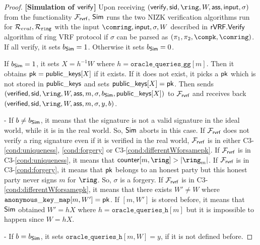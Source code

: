 \begin{proof}
		
		 \noindent\textbf{[Simulation of $ \mathsf{verify} $]} Upon receiving  $(\oramsg{verify}, \sid, \ring,W, \aux,\msg, \sigma)$ from the functionality $\mathcal{F}_{\textsf{rvrf}}$, $ \mathsf{Sim} $ runs the two NIZK verification algorithms run for $ \mathcal{R}_{eval}, \mathcal{R}_{\mathtt{ring}} $ with the input $ \comring, \msg, \sigma, W $ described in $ {\mathsf{rVRF}}.{\mathsf{Verify}} $ algorithm of ring VRF protocol if $ \sigma $ can be parsed as $ (\pi_1,\pi_2, \compk, \comring) $. If  all verify, it sets $ b_{\mathsf{Sim}} =1 $. Otherwise it sets $ b_{\mathsf{Sim}} =0  $.
		
		\noindent If $ b_{\mathsf{Sim}} = 1 $, it sets $ X = h^{-1} W$ where $ h = \mathtt{oracle\_queries\_gg}[m] $. Then it obtains $ \mathsf{pk}  = {\mathsf{public\_keys}}[X]$ if it exists. If it does not exist, it picks a $ \mathsf{pk}  $ which is not stored in $ {\mathsf{public\_keys}} $ and sets $ {\mathsf{public\_keys}}[X] = \mathsf{pk} $. Then sends  $ (\oramsg{verified}, \sid, \ring, W,\aux, m, \sigma, b_\simulator, \pkeys[X]) $ to $ \mathcal{F}_{\textsf{rvrf}} $ and receives back $ (\oramsg{verified}, \sid, \ring, W, \aux, m, \sigma, y, b) $. 
			
			- If $ b \neq b_{\mathsf{Sim}} $, it means that the signature is not a valid signature in the ideal world, while it is in the real world. So, $ \mathsf{Sim} $ aborts in this case.
				If $ \mathcal{F}_{\textsf{rvrf}} $ does not verify a ring signature even if  it is verified in the real world, $ \mathcal{F}_{\textsf{rvrf}} $ is in either C3-\ref{cond:uniqueness}, \ref{cond:forgery} or C3-\ref{cond:differentWforsamepk}.
				If $ \mathcal{F}_{\textsf{rvrf}} $ is in C3-\ref{cond:uniqueness}, it means that $ \counter[m,\ring] > |\ring_m| $. If $ \mathcal{F}_{\textsf{rvrf}} $ is in C3-\ref{cond:forgery}, it means that $ \mathsf{pk}$ belongs to an honest party but this honest party never signs $ m $ for  $ \ring $. So, $ \sigma $ is a forgery.	 If $ \mathcal{F}_{\textsf{rvrf}} $ is in C3- \ref{cond:differentWforsamepk}, it means that there exists $ W' \neq W $ where $ \mathtt{anonymous\_key\_map}[m,W'] = \mathsf{pk}$. If $ [m,W'] $ is stored before, it means that $ \mathsf{Sim} $ obtained $ W' = hX $ where $ h = \mathtt{oracle\_queries\_h}[m] $ but it is impossible to happen since $ W = hX $.
				
			  - If $ b = b_{\mathsf{Sim}} $, it sets $ \mathtt{oracle\_queries\_h}[m,W] = y $, if it is not defined before.
				
			

\end{proof}
